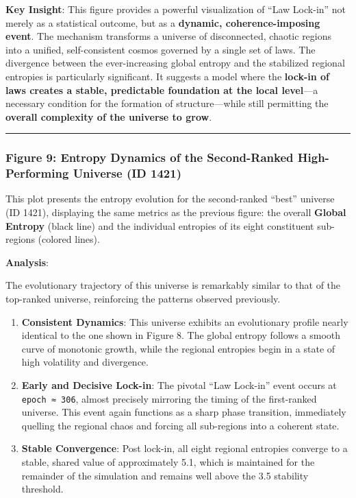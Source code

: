 \textbf{Key Insight}: This figure provides a powerful visualization of
``Law Lock-in'' not merely as a statistical outcome, but as a
\textbf{dynamic, coherence-imposing event}. The mechanism transforms a
universe of disconnected, chaotic regions into a unified,
self-consistent cosmos governed by a single set of laws. The divergence
between the ever-increasing global entropy and the stabilized regional
entropies is particularly significant. It suggests a model where the
\textbf{lock-in of laws creates a stable, predictable foundation at the
local level}---a necessary condition for the formation of
structure---while still permitting the \textbf{overall complexity of the
universe to grow}.

\begin{center}\rule{0.5\linewidth}{0.5pt}\end{center}

\subsubsection{Figure 9: Entropy Dynamics of the Second-Ranked
High-Performing Universe (ID
1421)}\label{figure-9-entropy-dynamics-of-the-second-ranked-high-performing-universe-id-1421}

This plot presents the entropy evolution for the second-ranked ``best''
universe (ID 1421), displaying the same metrics as the previous figure:
the overall \textbf{Global Entropy} (black line) and the individual
entropies of its eight constituent sub-regions (colored lines).

\textbf{Analysis}:

The evolutionary trajectory of this universe is remarkably similar to
that of the top-ranked universe, reinforcing the patterns observed
previously.

\begin{enumerate}
\def\labelenumi{\arabic{enumi}.}
\item
  \textbf{Consistent Dynamics}: This universe exhibits an evolutionary
  profile nearly identical to the one shown in Figure 8. The global
  entropy follows a smooth curve of monotonic growth, while the regional
  entropies begin in a state of high volatility and divergence.
\item
  \textbf{Early and Decisive Lock-in}: The pivotal ``Law Lock-in'' event
  occurs at \texttt{epoch\ ≈\ 306}, almost precisely mirroring the
  timing of the first-ranked universe. This event again functions as a
  sharp phase transition, immediately quelling the regional chaos and
  forcing all sub-regions into a coherent state.
\item
  \textbf{Stable Convergence}: Post lock-in, all eight regional
  entropies converge to a stable, shared value of approximately 5.1,
  which is maintained for the remainder of the simulation and remains
  well above the 3.5 stability threshold.
\end{enumerate}

